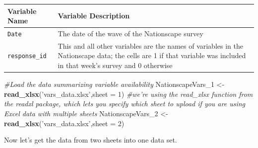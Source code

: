 \documentclass[
]{article}
\newenvironment{Shaded}{\begin{snugshade}}{\end{snugshade}}
\newcommand{\CommentTok}[1]{\textcolor[rgb]{0.56,0.35,0.01}{\textit{#1}}}
\newcommand{\DataTypeTok}[1]{\textcolor[rgb]{0.13,0.29,0.53}{#1}}
\newcommand{\DecValTok}[1]{\textcolor[rgb]{0.00,0.00,0.81}{#1}}
\newcommand{\KeywordTok}[1]{\textcolor[rgb]{0.13,0.29,0.53}{\textbf{#1}}}
\newcommand{\NormalTok}[1]{#1}
\newcommand{\OperatorTok}[1]{\textcolor[rgb]{0.81,0.36,0.00}{\textbf{#1}}}
\newcommand{\StringTok}[1]{\textcolor[rgb]{0.31,0.60,0.02}{#1}}
\begin{document}
\begin{longtable}[]{@{}ll@{}}
\toprule
\begin{minipage}[b]{0.33\columnwidth}\raggedright
Variable Name\strut
\end{minipage} & \begin{minipage}[b]{0.61\columnwidth}\raggedright
Variable Description\strut
\end{minipage}\tabularnewline
\midrule
\endhead
\begin{minipage}[t]{0.33\columnwidth}\raggedright
\texttt{Date}\strut
\end{minipage} & \begin{minipage}[t]{0.61\columnwidth}\raggedright
The date of the wave of the Nationscape survey\strut
\end{minipage}\tabularnewline
\begin{minipage}[t]{0.33\columnwidth}\raggedright
\texttt{response\_id}\strut
\end{minipage} & \begin{minipage}[t]{0.61\columnwidth}\raggedright
This and all other variables are the names of variables in the
Nationscape data; the cells are 1 if that variable was included in that
week's survey and 0 otherwise\strut
\end{minipage}\tabularnewline
\bottomrule
\end{longtable}

\begin{Shaded}
\begin{Highlighting}[]
\CommentTok{#Load the data summarizing variable availability}
\NormalTok{NationscapeVars_}\DecValTok{1}\NormalTok{ <-}\StringTok{ }\KeywordTok{read_xlsx}\NormalTok{(}\StringTok{'vars_data.xlsx'}\NormalTok{,}\DataTypeTok{sheet =} \DecValTok{1}\NormalTok{) }\CommentTok{#we're using the read_xlsx function from the readxl package, which lets you specify which sheet to upload if you are using Excel data with multiple sheets}
\NormalTok{NationscapeVars_}\DecValTok{2}\NormalTok{ <-}\StringTok{ }\KeywordTok{read_xlsx}\NormalTok{(}\StringTok{'vars_data.xlsx'}\NormalTok{,}\DataTypeTok{sheet =} \DecValTok{2}\NormalTok{)}
\end{Highlighting}
\end{Shaded}

Now let's get the data from two sheets into one data set.

\begin{Shaded}
\end{Shaded}
\end{document}
